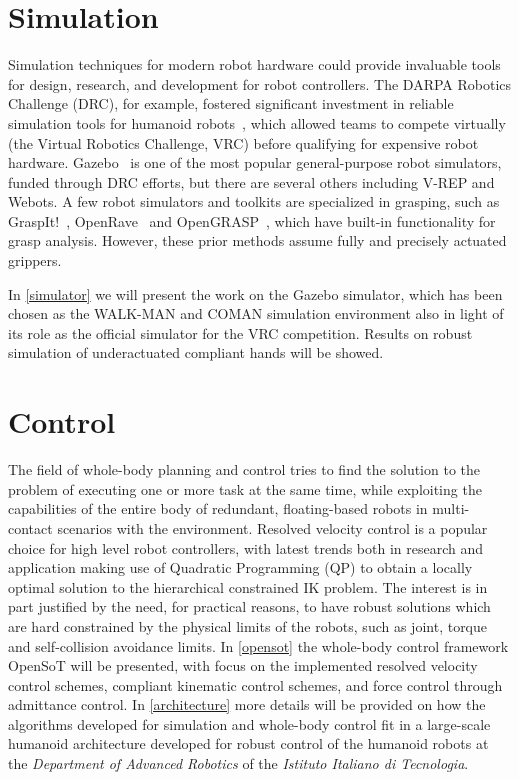 \documentclass[%
	paper=A4,					%
	twoside=true,				%
	openright,			.
	parskip=full,				%
	chapterprefix=true,			%
	11pt,						%
	headings=normal,			%
	bibliography=totoc,			%
	listof=totoc,				%
	titlepage=on,				%
	captions=tableabove,		%
	draft=false,				%
]{scrreprt}%
\begin{document}
\section{Simulation}
Simulation techniques for modern robot hardware could provide invaluable tools for design, research, and development for robot controllers.  The DARPA Robotics Challenge (DRC), for example, fostered significant investment in reliable simulation tools for humanoid robots~\cite{Hsu14}, which allowed teams to compete virtually (the Virtual Robotics Challenge, VRC) before qualifying for expensive robot hardware.  Gazebo~\cite{Koenig08} is one of the most popular general-purpose robot simulators, funded through DRC efforts, but there are several others including V-REP and Webots.  A few robot simulators and toolkits are specialized in grasping, such as GraspIt!~\cite{Miller04}, OpenRave~\cite{Diankov08OpenRAVE} and OpenGRASP~\cite{Leon10OpenGRASP}, which have built-in functionality for grasp analysis. However, these prior methods assume fully and precisely actuated grippers. 

In \ref{simulator} we will present the work on the Gazebo simulator, which has been chosen as the WALK-MAN and COMAN simulation environment also in light of its role as the official simulator for the VRC competition. Results on robust simulation of underactuated compliant hands will be showed.

\section{Control}
The field of whole-body planning and control tries to find the solution to the problem of executing one or more task at the same time, while exploiting the capabilities of the entire body of redundant, floating-based robots in multi-contact scenarios with the environment.
Resolved velocity control is a popular choice for high level robot controllers, with latest trends both in research and application making use of Quadratic Programming (QP) to obtain a locally optimal solution to the hierarchical constrained IK problem. The interest is in part justified by the need, for practical reasons, to have robust solutions which are hard constrained by the physical limits of the robots, such as joint, torque and self-collision avoidance limits.
In \ref{opensot} the whole-body control framework OpenSoT will be presented, with focus on the implemented resolved velocity control schemes, compliant kinematic control schemes, and force control through admittance control. In \ref{architecture} more details will be provided on how the algorithms developed for simulation and whole-body control fit in a large-scale humanoid architecture developed for robust control of the humanoid robots at the \emph{Department of Advanced Robotics} of the \emph{Istituto Italiano di Tecnologia}.
\end{document}
